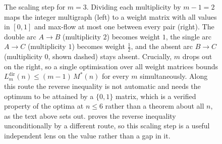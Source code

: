\begin{figure}[ht]
\centering
{}
\caption{The scaling step for $m = 3$. Dividing each multiplicity by $m - 1 = 2$ maps the integer multigraph (left) to a weight matrix with all values in $[0, 1]$ and max-flow at most one between every pair (right). The double arc $A \to B$ (multiplicity $2$) becomes weight $1$, the single arc $A \to C$ (multiplicity $1$) becomes weight $\tfrac{1}{2}$, and the absent arc $B \to C$ (multiplicity $0$, shown dashed) stays absent. Crucially, $m$ drops out on the right, so a single optimisation over all weight matrices bounds $L_m^{\mathrm{dir}}(n) \le (m-1)\,M^*(n)$ for every $m$ simultaneously. Along this route the reverse inequality is not automatic and needs the optimum to be attained by a $\{0,1\}$ matrix, which is a verified property of the optima at $n \le 6$ rather than a theorem about all $n$, as the text above sets out.  proves the reverse inequality unconditionally by a different route, so this scaling step is a useful independent lens on the value rather than a gap in it.}
\label{fig:scaling-reduction}
\end{figure}

